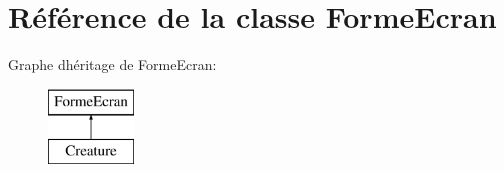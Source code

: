 \hypertarget{class_forme_ecran}{}\section{Référence de la classe Forme\+Ecran}
\label{class_forme_ecran}
Graphe d\textquotesingle{}héritage de Forme\+Ecran\+:\begin{figure}[H]
\begin{center}
\leavevmode
\includegraphics[height=2.000000cm]{class_forme_ecran}
\end{center}
\end{figure}
